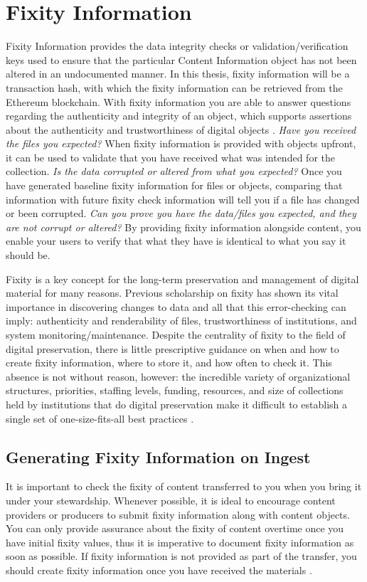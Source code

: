 \section{Fixity Information}
Fixity Information provides the data integrity checks or validation/verification keys used to ensure that the particular Content Information object has not been altered in an undocumented manner\cite[8]{lee2010open}. In this thesis, fixity information will be a transaction hash, with which the fixity information can be retrieved from the Ethereum blockchain.
With fixity information you are able to answer questions regarding the authenticity and integrity of an object, which supports assertions about the authenticity and trustworthiness of digital objects \cite[3]{ndsa2017fixity}.
\newline \textit{Have you received the files you expected?} When fixity information is provided with objects upfront, it can be used to validate that you have received what was intended for the collection.
\newline \textit{Is the data corrupted or altered from what you expected?}  Once you have generated baseline fixity information for files or objects, comparing that information with future fixity check information will tell you if a file has changed or been corrupted.
\newline \textit{Can you prove you have the data/files you expected, and they are not corrupt or altered?} By providing fixity information alongside content, you enable your users to verify that what they have is identical to what you say it should be. 

Fixity is a key concept for the long-term preservation and management of digital material for many reasons. Previous scholarship on fixity has shown its vital importance in discovering changes to data and all that this error-checking can imply: authenticity and renderability of files, trustworthiness of institutions, and system monitoring/maintenance. Despite the centrality of fixity to the field of digital preservation, there is little prescriptive guidance on when and how to create fixity information, where to store it, and how often to check it. This absence is not without reason, however: the incredible variety of organizational structures, priorities, staffing levels, funding, resources, and size of collections held by institutions that do digital preservation make it difficult to establish a single set of one-size-fits-all best practices \cite[38]{ndsa2017fixity}.
\subsection{Generating Fixity Information on Ingest}
 It is important to check the fixity
of content transferred to you when you bring it under your stewardship. Whenever possible, it is ideal to encourage content providers or producers to submit fixity information along with content objects. You can only provide assurance about the fixity of content overtime once you have initial fixity values, thus it is imperative to document fixity information as soon as possible. If fixity information is not provided as part of the transfer, you should create fixity information once you have received the materials \cite[4]{ndsa2014fixity}.

